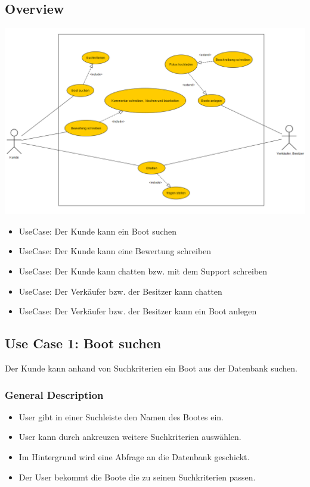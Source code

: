 \documentclass[12pt]{article}
\theoremstyle{definition}
\begin{document}
\subsection{Overview}
	\includegraphics[height=0.50\textwidth]{UseCaseDiagram.PNG}
	\begin{itemize}
		\item UseCase: Der Kunde kann ein Boot suchen
		\item UseCase: Der Kunde kann eine Bewertung schreiben
		\item UseCase: Der Kunde kann chatten bzw. mit dem Support schreiben
		\item UseCase: Der Verkäufer bzw. der Besitzer kann chatten
		\item UseCase: Der Verkäufer bzw. der Besitzer kann ein Boot anlegen 
	\end{itemize}

\subsection{Use Case 1: Boot suchen}
Der Kunde kann anhand von Suchkriterien ein Boot aus der Datenbank suchen.
\subsubsection{General Description}
	\begin{itemize}
		\item User gibt in einer Suchleiste den Namen des Bootes ein.
		\item User kann durch ankreuzen weitere Suchkriterien auswählen.
		\item Im Hintergrund wird eine Abfrage an die Datenbank geschickt.
		\item Der User bekommt die Boote die zu seinen Suchkriterien passen.
	\end{itemize}
\end{document}
